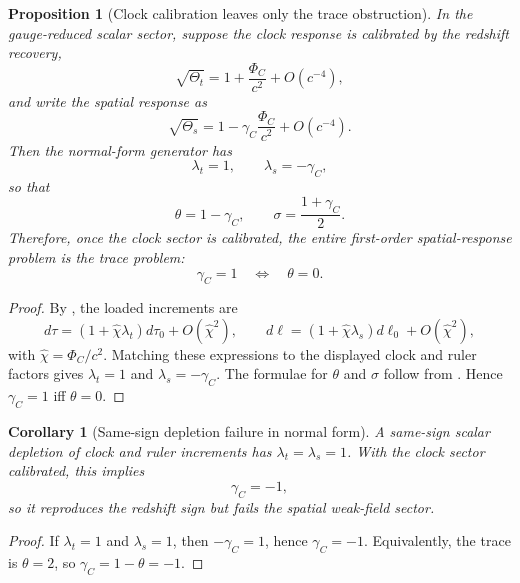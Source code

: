 \documentclass[11pt]{article}
\newtheorem{proposition}[theorem]{Proposition}
\newtheorem{corollary}[theorem]{Corollary}
\theoremstyle{remark}
\begin{document}
\begin{proposition}[Clock calibration leaves only the trace obstruction]
\label{prop:normal-form-trace-obstruction}
In the gauge-reduced scalar sector, suppose the clock response is calibrated by the redshift recovery,
\[
        \sqrt{\Theta_t}=1+\frac{\Phi_C}{c^2}+O(c^{-4}),
\]
and write the spatial response as
\[
        \sqrt{\Theta_s}=1-\gamma_C\frac{\Phi_C}{c^2}+O(c^{-4}).
\]
Then the normal-form generator has
\[
        \lambda_t=1,
        \qquad
        \lambda_s=-\gamma_C,
\]
so that
\[
        \theta=1-
        \gamma_C,
        \qquad
        \sigma=\frac{1+
        \gamma_C}{2}.
\]
Therefore, once the clock sector is calibrated, the entire first-order spatial-response problem is the trace problem:
\[
        \gamma_C=1
        \quad\Longleftrightarrow\quad
        \theta=0.
\]
\end{proposition}

\begin{proof}
By , the loaded increments are
\[
        d\tau=(1+\hat\chi\lambda_t)d\tau_0+O(\hat\chi^2),
        \qquad
        d\ell=(1+\hat\chi\lambda_s)d\ell_0+O(\hat\chi^2),
\]
with \(\hat\chi=\Phi_C/c^2\).  Matching these expressions to the displayed clock and ruler factors gives \(\lambda_t=1\) and \(\lambda_s=-\gamma_C\).  The formulae for \(\theta\) and \(\sigma\) follow from .  Hence \(\gamma_C=1\) iff \(\theta=0\).
\end{proof}

\begin{corollary}[Same-sign depletion failure in normal form]
\label{cor:same-sign-failure-normal-form}
A same-sign scalar depletion of clock and ruler increments has \(\lambda_t=\lambda_s=1\).  With the clock sector calibrated, this implies
\[
        \gamma_C=-1,
\]
so it reproduces the redshift sign but fails the spatial weak-field sector.
\end{corollary}

\begin{proof}
If \(\lambda_t=1\) and \(\lambda_s=1\), then \(-\gamma_C=1\), hence \(\gamma_C=-1\).  Equivalently, the trace is \(\theta=2\), so \(\gamma_C=1-\theta=-1\).
\end{proof}
\end{document}
